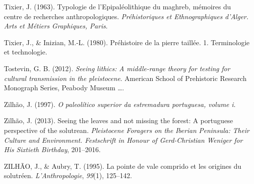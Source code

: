 \documentclass[12pt,twoside]{reedthesis}
\begin{document}
\leavevmode\hypertarget{ref-tixier1963}{}%
Tixier, J. (1963). Typologie de l'Epipaléolithique du maghreb, mémoires du centre de recherches anthropologiques. \emph{Préhistoriques et Ethnographiques d'Alger. Arts et Métiers Graphiques, Paris}.

\leavevmode\hypertarget{ref-tixier1980}{}%
Tixier, J., \& Inizian, M.-L. (1980). Préhistoire de la pierre taillée. 1. Terminologie et technologie.

\leavevmode\hypertarget{ref-tostevin2012}{}%
Tostevin, G. B. (2012). \emph{Seeing lithics: A middle-range theory for testing for cultural transmission in the pleistocene}. American School of Prehistoric Research Monograph Series, Peabody Museum \ldots.

\leavevmode\hypertarget{ref-zilhao1997}{}%
Zilhão, J. (1997). \emph{O paleolítico superior da estremadura portuguesa, volume i}.

\leavevmode\hypertarget{ref-zilhao2013}{}%
Zilhão, J. (2013). Seeing the leaves and not missing the forest: A portuguese perspective of the solutrean. \emph{Pleistocene Foragers on the Iberian Peninsula: Their Culture and Environment. Festschrift in Honour of Gerd-Christian Weniger for His Sixtieth Birthday}, 201--2016.

\leavevmode\hypertarget{ref-zilhaoetal1995}{}%
ZILHÃO, J., \& Aubry, T. (1995). La pointe de vale comprido et les origines du solutréen. \emph{L'Anthropologie}, \emph{99}(1), 125--142.

\appendix
\end{document}
